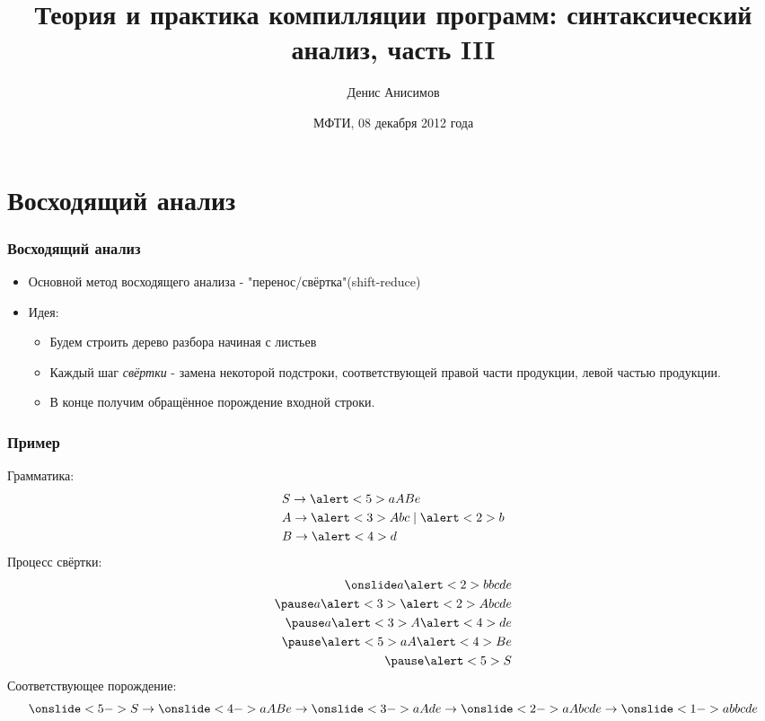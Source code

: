 \documentclass[16pt,pdf,unicode]{beamer}
\title[Синтаксический анализ]{Теория и практика компилляции программ: синтаксический анализ, часть III}
\author[Д. Анисимов]{Денис Анисимов}
\institute[МФТИ]{Московский физико-технический университет\\
	{\tiny государственный университет}\\}
\date[08.12.2012]{МФТИ, 08 декабря 2012 года}
\begin{document}
\begin{frame}[plain]
\setcounter{framenumber}{0}
\titlepage
\end{frame}

\section{Восходящий анализ}
\begin{frame}
\frametitle{Восходящий анализ}
\begin{itemize}
  \item Основной метод восходящего анализа - "перенос/свёртка"(shift-reduce)
  \item Идея:
    \begin{itemize}
      \item Будем строить дерево разбора начиная с листьев
      \item Каждый шаг \textit{свёртки} - замена некоторой подстроки, соответствующей правой части продукции, левой частью продукции. 
      \item В конце получим обращённое порождение входной строки.
    \end{itemize}
\end{itemize}
\end{frame}

\begin{frame}
\frametitle{Пример}
Грамматика:
\begin{align*}
  &S \rightarrow \alert<5>{aABe}\\
  &A \rightarrow \alert<3>{Abc} \mid \alert<2>{b}\\
  &B \rightarrow \alert<4>{d}
\end{align*}
Процесс свёртки:
\begin{align*}
\onslide
a{\alert<2>{b}}bcde\\
\pause
a\alert<3>{\alert<2>{A}bc}de\\
\pause
a\alert<3>{A}\alert<4>{d}e\\
\pause
\alert<5>{aA\alert<4>{B}e}\\
\pause
\alert<5>{S}\\
\end{align*}
Соответствующее порождение:
$$\onslide<5->S \rightarrow\onslide<4-> aABe \rightarrow\onslide<3-> aAde \rightarrow \onslide<2->aAbcde \rightarrow \onslide<1->abbcde $$
\end{frame}
\end{document}
